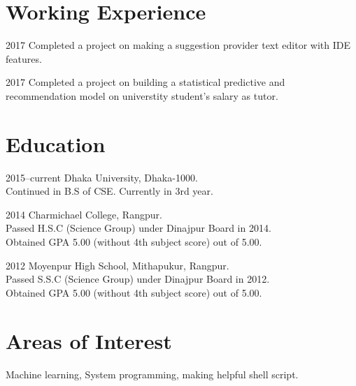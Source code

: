\documentclass[a4paper]{article}
\begin{document}
\section{Working Experience}

\begin{CV}

\item[2017] Completed a project on making a suggestion provider text editor with IDE features.
\item[2017] Completed a project on building a statistical predictive and recommendation model on universtity student's salary as tutor.
\end{CV}


\section{Education}

\begin{CV}
\item[2015--current] Dhaka University, Dhaka-1000.\\Continued in B.S of CSE. Currently in 3rd year.
\item[2014] Charmichael College, Rangpur.\\Passed H.S.C (Science Group) under Dinajpur Board in 2014.\\Obtained GPA 5.00 (without 4th subject score) out of 5.00.
\item[2012] Moyenpur High School, Mithapukur, Rangpur.\\Passed S.S.C (Science Group) under Dinajpur Board in 2012.\\Obtained GPA 5.00 (without 4th subject score) out of 5.00.
\end{CV}




\section{Areas of Interest}
\begin{CV}
\item Machine learning, System programming, making helpful shell script.
\end{CV}
\end{document}
